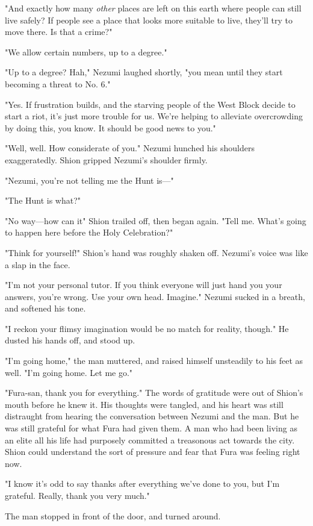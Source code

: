 "And exactly how many \emph{other} places are left on this earth where people
can still live safely? If people see a place that looks more suitable to
live, they'll try to move there. Is that a crime?"

"We allow certain numbers, up to a degree."

"Up to a degree? Hah," Nezumi laughed shortly, "you mean until they
start becoming a threat to No. 6."

"Yes. If frustration builds, and the starving people of the West Block
decide to start a riot, it's just more trouble for us. We're helping to
alleviate overcrowding by doing this, you know. It should be good news
to you."

"Well, well. How considerate of you." Nezumi hunched his shoulders
exaggeratedly. Shion gripped Nezumi's shoulder firmly.

"Nezumi, you're not telling me the Hunt is---"

"The Hunt is what?"

"No way---how can it\el " Shion trailed off, then began again. "Tell me.
What's going to happen here before the Holy Celebration?"

"Think for yourself!" Shion's hand was roughly shaken off. Nezumi's
voice was like a slap in the face.

"I'm not your personal tutor. If you think everyone will just hand you
your answers, you're wrong. Use your own head. Imagine." Nezumi sucked
in a breath, and softened his tone.

"I reckon your flimsy imagination would be no match for reality,
though." He dusted his hands off, and stood up.

"I'm going home," the man muttered, and raised himself unsteadily to his
feet as well. "I'm going home. Let me go."

"Fura-san, thank you for everything." The words of gratitude were out of
Shion's mouth before he knew it. His thoughts were tangled, and his
heart was still distraught from hearing the conversation between Nezumi
and the man. But he was still grateful for what Fura had given them. A
man who had been living as an elite all his life had purposely committed
a treasonous act towards the city. Shion could understand the sort of
pressure and fear that Fura was feeling right now.

"I know it's odd to say thanks after everything we've done to you, but
I'm grateful. Really, thank you very much."

The man stopped in front of the door, and turned around.


